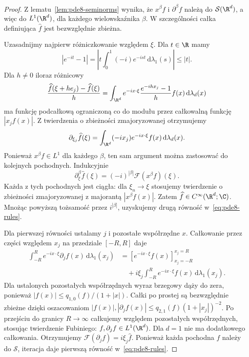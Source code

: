 \begin{proof}
Z lematu~\ref{lem:pde8-seminorms} wynika, że
$x^\beta f$ i $\partial^\beta f$ należą do
$\mathcal S(\R^d)$, a więc do $L^1(\R^d)$,
dla każdego wielowskaźnika $\beta$.
W szczególności całka definiująca $\widehat f$
jest bezwzględnie zbieżna.

Uzasadnijmy najpierw różniczkowanie względem $\xi$.
Dla $t\in\R$ mamy
\[
 |e^{-it}-1|
 =\left|t\int_0^1(-i)e^{-ist}\,\mathrm d\lambda_1(s)\right|
 \le |t|.
\]
Dla $h\ne0$ iloraz różnicowy
\[
 \frac{\widehat f(\xi+he_j)-\widehat f(\xi)}h
 =\int_{\R^d}e^{-ix\cdot\xi}
 \frac{e^{-ihx_j}-1}{h}f(x)\,\mathrm d\lambda_d(x)
\]
ma funkcję podcałkową ograniczoną co do modułu
przez całkowalną funkcję $|x_j f(x)|$.
Z twierdzenia o zbieżności zmajoryzowanej
otrzymujemy
\[
 \partial_{\xi_j}\widehat f(\xi)
 =\int_{\R^d}(-ix_j)e^{-ix\cdot\xi}f(x)
 \,\mathrm d\lambda_d(x).
\]
Ponieważ $x^\beta f\in L^1$ dla każdego $\beta$,
ten sam argument można zastosować do kolejnych
pochodnych. Indukcyjnie
\[
 \partial_\xi^\beta\widehat f(\xi)
 =(-i)^{|\beta|}\mathcal F(x^\beta f)(\xi).
\]
Każda z tych pochodnych jest ciągła: dla
$\xi_n\to\xi$ stosujemy twierdzenie o zbieżności
zmajoryzowanej z majorantą $|x^\beta f(x)|$.
Zatem $\widehat f\in C^\infty(\R^d;\C)$.
Mnożąc powyższą tożsamość przez $i^{|\beta|}$,
uzyskujemy drugą równość w~\eqref{eq:pde8-rules}.

Dla pierwszej równości ustalamy $j$ i pozostałe
współrzędne $x$. Całkowanie przez części względem
$x_j$ na przedziale $[-R,R]$ daje
\[
 \begin{aligned}
 \int_{-R}^R e^{-ix\cdot\xi}\partial_j f(x)
 \,\mathrm d\lambda_1(x_j)
 &=\left[e^{-ix\cdot\xi}f(x)\right]_{x_j=-R}^{x_j=R}\\
 &\quad+i\xi_j\int_{-R}^R e^{-ix\cdot\xi}f(x)
 \,\mathrm d\lambda_1(x_j).
 \end{aligned}
\]
Dla ustalonych pozostałych współrzędnych wyraz
brzegowy dąży do zera, ponieważ
$|f(x)|\le q_{1,0}(f)/(1+|x|)$.
Całki po prostej są bezwzględnie zbieżne dzięki
oszacowaniom $|f(x)|,|\partial_j f(x)|
\le q_{2,1}(f)(1+|x_j|)^{-2}$.
Po przejściu do granicy $R\to\infty$ całkujemy
względem pozostałych współrzędnych, stosując
twierdzenie Fubiniego: $f,\partial_j f\in L^1(\R^d)$.
Dla $d=1$ nie ma dodatkowego całkowania.
Otrzymujemy $\mathcal F(\partial_j f)=i\xi_j\widehat f$.
Ponieważ każda pochodna $f$ należy do $\mathcal S$,
iteracja daje pierwszą równość w~\eqref{eq:pde8-rules}.


\end{proof}
